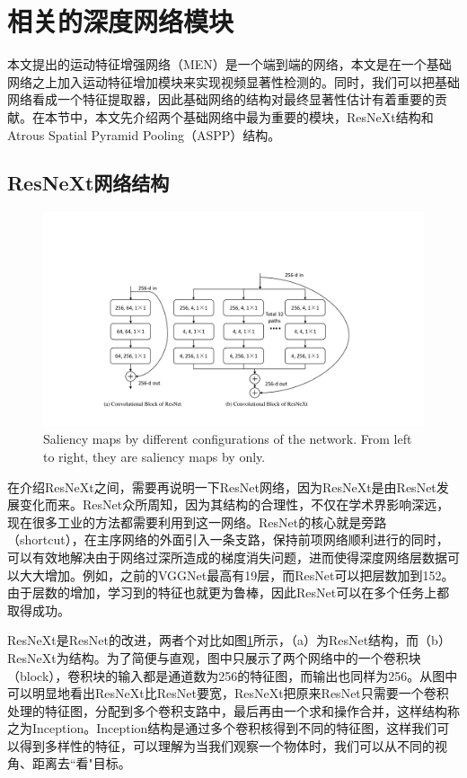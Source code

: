 \section{相关的深度网络模块}
本文提出的运动特征增强网络（MEN）是一个端到端的网络，本文是在一个基础网络之上加入运动特征增加模块来实现视频显著性检测的。同时，我们可以把基础网络看成一个特征提取器，因此基础网络的结构对最终显著性估计有着重要的贡献。在本节中，本文先介绍两个基础网络中最为重要的模块，ResNeXt结构和Atrous Spatial Pyramid Pooling（ASPP）结构。

\subsection{ResNeXt网络结构}

\begin{figure}
\center
\includegraphics[width=1\textwidth]{figures/resnext}
\caption{Saliency maps by different configurations of the network. From left to right, they are saliency maps by only.}
\label{resnext}
\end{figure}

在介绍ResNeXt之间，需要再说明一下ResNet网络，因为ResNeXt是由ResNet发展变化而来。ResNet众所周知，因为其结构的合理性，不仅在学术界影响深远，现在很多工业的方法都需要利用到这一网络。ResNet的核心就是旁路（shortcut），在主序网络的外面引入一条支路，保持前项网络顺利进行的同时，可以有效地解决由于网络过深所造成的梯度消失问题，进而使得深度网络层数据可以大大增加。例如，之前的VGGNet最高有19层，而ResNet可以把层数加到152。由于层数的增加，学习到的特征也就更为鲁棒，因此ResNet可以在多个任务上都取得成功。

ResNeXt是ResNet的改进，两者个对比如图\ref{resnext}所示，（a）为ResNet结构，而（b）ResNeXt为结构。为了简便与直观，图中只展示了两个网络中的一个卷积块（block），卷积块的输入都是通道数为256的特征图，而输出也同样为256。从图中可以明显地看出ResNeXt比ResNet要宽，ResNeXt把原来ResNet只需要一个卷积处理的特征图，分配到多个卷积支路中，最后再由一个求和操作合并，这样结构称之为Inception。Inception结构是通过多个卷积核得到不同的特征图，这样我们可以得到多样性的特征，可以理解为当我们观察一个物体时，我们可以从不同的视角、距离去``看"目标。


